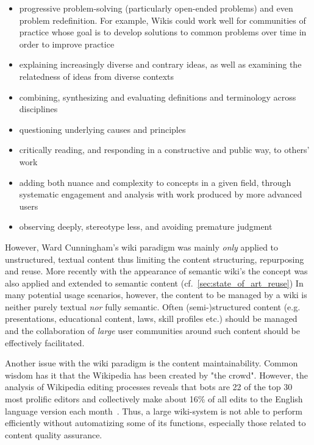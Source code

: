 \documentclass[ngerman,UKenglish,table]{scrbook}
\begin{document}
\begin{itemize}
\item progressive problem-solving (particularly open-ended problems) and even problem redefinition.
For example, Wikis could work well for communities of practice whose goal is to develop solutions to common problems over time in order to improve practice
\item explaining increasingly diverse and contrary ideas, as well as examining the relatedness of ideas from diverse contexts
\item combining, synthesizing and evaluating definitions and terminology
across disciplines
\item questioning underlying causes and principles
\item critically reading, and responding in a constructive and public way, to others’ work
\item adding both nuance and complexity to concepts in a given field, through systematic engagement and analysis with work produced by more advanced users
\item observing deeply, stereotype less, and avoiding premature
judgment

\end{itemize}

However, Ward Cunningham's wiki paradigm was mainly \emph{only} applied to unstructured, textual content thus limiting the content structuring, repurposing and reuse.
More recently with the appearance of semantic wiki's the concept was also applied and extended to semantic content (cf.~\autoref{sec:state_of_art_reuse})
In many potential usage scenarios, however, the content to be managed by a wiki is neither purely textual \emph{nor} fully semantic.
Often (semi-)structured content (e.g. presentations, educational content, laws, skill profiles etc.) should be managed and the collaboration of \emph{large} user communities around such content should be effectively facilitated.

Another issue with the wiki paradigm is the content maintainability.
Common wisdom has it that the Wikipedia has been created by "the crowd".
However, the analysis of Wikipedia editing processes reveals that bots are 22 of the top 30 most prolific editors and collectively make about 16\% of all edits to the English language version each month~\cite{geiger2011lives}.
Thus, a large wiki-system is not able to perform efficiently without automatizing some of its functions, especially those related to content quality assurance.
\end{document}
